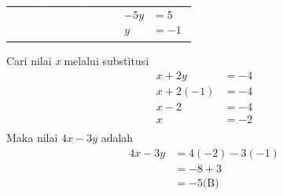 \documentclass{report}
\begin{document}
\begin{enumerate}
\begin{center}
	\begin{tabular}{c c c}
		\parbox{3cm}{\textcolor{white}{
			\begin{align*}
			x+2y &= -4 \\
			2x-y &= -3
			\end{align*}}
		} & \parbox{0.3cm}{\textcolor{white}{
			-2 \\ 1 }
		} &
		\parbox{3cm}{
			\begin{align*}
				-5y&=5\\
				y&=-1
			\end{align*}
		} \\
	\end{tabular}
	\end{center}
	Cari nilai \emph{x} melalui substitusi
	\begin{align*}
		x+2y&=-4\\
		x+2(-1)&=-4\\
		x-2&=-4\\
		x&=-2\\
	\end{align*}
	Maka nilai $4x-3y$ adalah \\
	\begin{align*}
	4x-3y&=4(-2)-3(-1)\\
	&=-8+3 \\
	&=-5 \text{(B)}
	\end{align*}


\end{enumerate}
\end{document}
